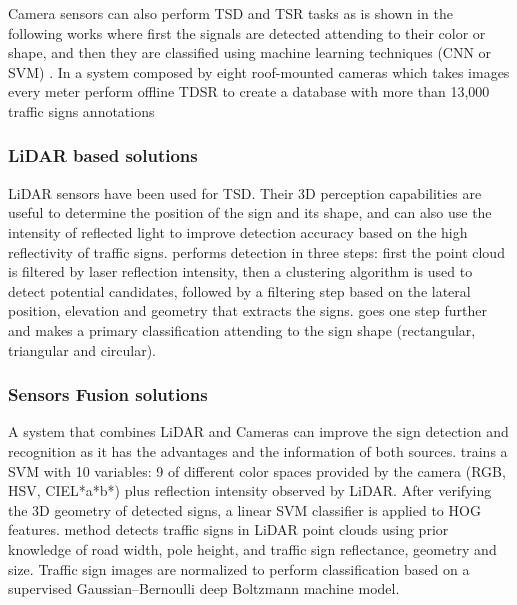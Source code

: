 Camera sensors can also perform TSD and TSR tasks as is 
shown in the following works where first the signals are detected attending to
their color or shape, and then they are classified using machine learning techniques (CNN or SVM)
\cite{miyata2017automatic, yang2016towards, wali2015automatic}. In \cite{timofte2014multi}
a system composed by eight roof-mounted cameras which takes images every meter
perform offline TDSR to create a database with more than 13,000 traffic signs annotations


\subsubsection{LiDAR based solutions}
LiDAR sensors have been used for TSD. Their 3D perception capabilities are 
useful to determine the position of the sign and its shape, and can also use 
the intensity of reflected light to improve detection accuracy based on the
high reflectivity of traffic signs. \cite{gargoum2017automated} 
performs detection in three steps: first the point cloud is filtered by 
laser reflection intensity, then a clustering algorithm is used to detect 
potential candidates, followed by a filtering step based on the lateral 
position, elevation and geometry that extracts the signs. 
\cite{weng2016road} goes one step further and makes a primary 
classification attending to the sign shape (rectangular, triangular and 
circular).

\subsubsection{Sensors Fusion solutions}
A system that combines LiDAR and Cameras can improve the sign detection and 
recognition as it has the advantages and the information of both sources. 
\cite{zhou2014lidar} trains a SVM with 10 variables: 9 of different color 
spaces provided by the camera (RGB, HSV, CIEL*a*b*) plus reflection intensity 
observed by LiDAR. After verifying the 3D geometry of detected signs, a linear
SVM classifier is applied to HOG features.
\cite{guan2018robust} method detects traffic signs in LiDAR point clouds
using prior knowledge of road width, pole height, and traffic sign reflectance, 
geometry and size. Traffic sign images are normalized to perform classification 
based on a supervised Gaussian–Bernoulli deep Boltzmann machine model.


